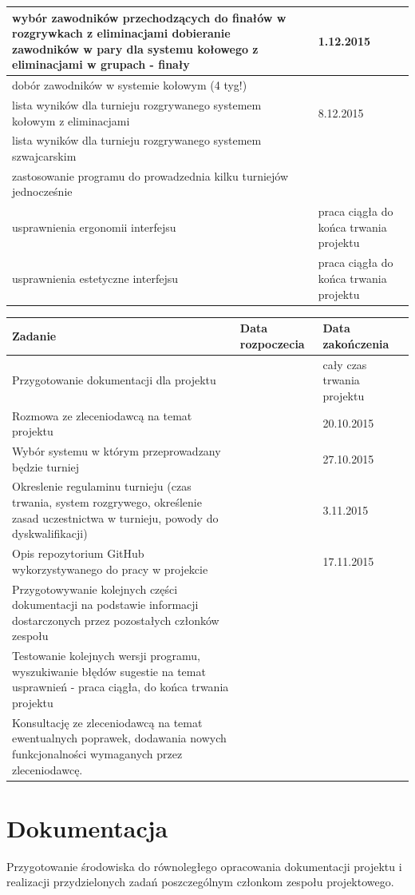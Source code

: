 \begin{tabular}{|p{9cm}|l|p{3cm}|}
wybór zawodników przechodzących do finałów w rozgrywkach z eliminacjami
dobieranie zawodników w pary dla systemu kołowego z eliminacjami w grupach - finały&&1.12.2015\\ \hline
dobór zawodników w systemie kołowym (4 tyg!)&&\\ \hline 
lista wyników dla turnieju rozgrywanego systemem kołowym z eliminacjami&&8.12.2015\\ \hline
lista wyników dla turnieju rozgrywanego systemem szwajcarskim&&\\ \hline 
zastosowanie programu do prowadzednia kilku turniejów jednocześnie&&\\ \hline
usprawnienia ergonomii interfejsu&&praca ciągła do końca trwania projektu\\ \hline
usprawnienia estetyczne interfejsu&&praca ciągła do końca trwania projektu\\ \hline

\end{tabular}

\begin{tabular}{|p{9cm}|l|p{3cm}|} \hline
Zadanie & Data rozpoczecia & Data zakończenia\\ \hline
Przygotowanie dokumentacji dla projektu&&cały czas trwania projektu\\ \hline
Rozmowa ze zleceniodawcą na temat projektu &&20.10.2015\\ \hline
Wybór systemu w którym przeprowadzany będzie turniej &&27.10.2015\\ \hline
Okreslenie regulaminu turnieju (czas trwania,  system rozgrywego, określenie zasad uczestnictwa w turnieju, powody do dyskwalifikacji) &&3.11.2015\\ \hline
Opis repozytorium GitHub wykorzystywanego do pracy w projekcie &&17.11.2015\\ \hline
Przygotowywanie kolejnych części dokumentacji na podstawie informacji dostarczonych przez pozostałych członków zespołu&&\\ \hline
Testowanie kolejnych wersji  programu, wyszukiwanie błędów sugestie na temat usprawnień - praca ciągła, do końca trwania projektu&&\\ \hline
Konsultację ze zleceniodawcą na temat ewentualnych poprawek, dodawania nowych funkcjonalności wymaganych przez zleceniodawcę.&&\\ \hline 
\end{tabular}

\section{Dokumentacja}
Przygotowanie środowiska do równoległego opracowania dokumentacji projektu i realizacji przydzielonych zadań poszczególnym członkom zespołu projektowego.

